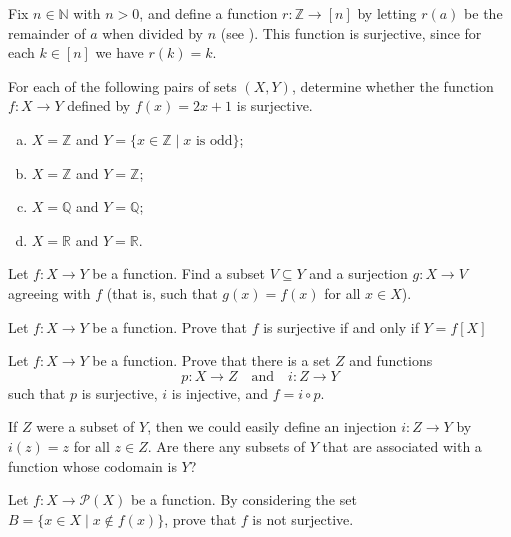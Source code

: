 \begin{example}
Fix $n \in \mathbb{N}$ with $n > 0$, and define a function $r : \mathbb{Z} \to [n]$ by letting $r(a)$ be the remainder of $a$ when divided by $n$ (see ). This function is surjective, since for each $k \in [n]$ we have $r(k)=k$.
\end{example}

\begin{exercise}
For each of the following pairs of sets $(X,Y)$, determine whether the function $f : X \to Y$ defined by $f(x)=2x+1$ is surjective.
\begin{enumerate}[(a)]
\item $X = \mathbb{Z}$ and $Y = \{ x \in \mathbb{Z} \mid x \text{ is odd} \}$;
\item $X = \mathbb{Z}$ and $Y = \mathbb{Z}$;
\item $X = \mathbb{Q}$ and $Y = \mathbb{Q}$;
\item $X = \mathbb{R}$ and $Y = \mathbb{R}$.
\end{enumerate}
\end{exercise}

\begin{exercise}
Let $f : X \to Y$ be a function. Find a subset $V \subseteq Y$ and a surjection $g : X \to V$ agreeing with $f$ (that is, such that $g(x)=f(x)$ for all $x \in X$).
\end{exercise}

\begin{exercise}
Let $f : X \to Y$ be a function. Prove that $f$ is surjective if and only if $Y=f[X]$
\end{exercise}

\begin{exercise}
\label{exEpiMonoFactorisation}
Let $f : X \to Y$ be a function. Prove that there is a set $Z$ and functions
\[ p : X \to Z \quad \text{and} \quad i : Z \to Y \]
such that $p$ is surjective, $i$ is injective, and $f = i \circ p$.
\begin{backhint}
If $Z$ were a subset of $Y$, then we could easily define an injection $i : Z \to Y$ by $i(z)=z$ for all $z \in Z$. Are there any subsets of $Y$ that are associated with a function whose codomain is $Y$?
\end{backhint}
\end{exercise}

\begin{exercise}
Let $f : X \to \mathcal{P}(X)$ be a function. By considering the set $B = \{ x \in X \mid x \not\in f(x) \}$, prove that $f$ is not surjective.
\end{exercise}

